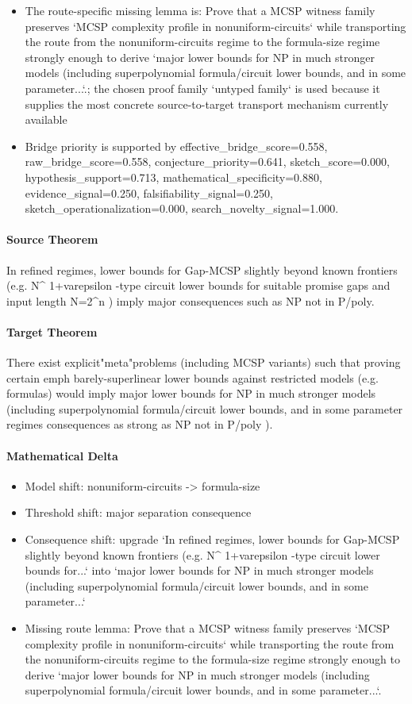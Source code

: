 \documentclass[11pt]{article}
\begin{document}
\begin{itemize}
\item The route-specific missing lemma is: Prove that a MCSP witness family preserves `MCSP complexity profile in nonuniform-circuits` while transporting the route from the nonuniform-circuits regime to the formula-size regime strongly enough to derive `major lower bounds for NP in much stronger models (including superpolynomial formula/circuit lower bounds, and in some parameter...`.; the chosen proof family `untyped family` is used because it supplies the most concrete source-to-target transport mechanism currently available
\item Bridge priority is supported by effective\_bridge\_score=0.558, raw\_bridge\_score=0.558, conjecture\_priority=0.641, sketch\_score=0.000, hypothesis\_support=0.713, mathematical\_specificity=0.880, evidence\_signal=0.250, falsifiability\_signal=0.250, sketch\_operationalization=0.000, search\_novelty\_signal=1.000.
\end{itemize}
\paragraph{Source Theorem}
In refined regimes, lower bounds for Gap-MCSP slightly beyond known frontiers (e.g. N\textasciicircum{} 1+varepsilon -type circuit lower bounds for suitable promise gaps and input length N=2\textasciicircum{}n ) imply major consequences such as NP not in P/poly.
\paragraph{Target Theorem}
There exist explicit"meta"problems (including MCSP variants) such that proving certain emph barely-superlinear lower bounds against restricted models (e.g. formulas) would imply major lower bounds for NP in much stronger models (including superpolynomial formula/circuit lower bounds, and in some parameter regimes consequences as strong as NP not in P/poly ).
\paragraph{Mathematical Delta}
\begin{itemize}
\item Model shift: nonuniform-circuits -> formula-size
\item Threshold shift: major separation consequence
\item Consequence shift: upgrade `In refined regimes, lower bounds for Gap-MCSP slightly beyond known frontiers (e.g. N\textasciicircum{} 1+varepsilon -type circuit lower bounds for...` into `major lower bounds for NP in much stronger models (including superpolynomial formula/circuit lower bounds, and in some parameter...`
\item Missing route lemma: Prove that a MCSP witness family preserves `MCSP complexity profile in nonuniform-circuits` while transporting the route from the nonuniform-circuits regime to the formula-size regime strongly enough to derive `major lower bounds for NP in much stronger models (including superpolynomial formula/circuit lower bounds, and in some parameter...`.
\end{itemize}
\end{document}
